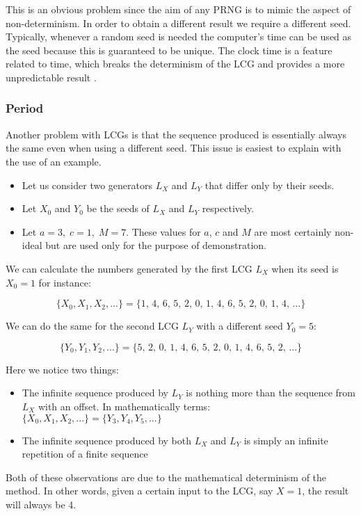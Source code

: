 This is an obvious problem since the aim of any PRNG is to mimic the aspect of non-determinism. In order to obtain a different result we require a different seed. Typically, whenever a random seed is needed the computer's time can be used as the seed because this is guaranteed to be unique. The clock time is a feature related to time, which breaks the determinism of the LCG and provides a more unpredictable result \citep{Knuth_art2}.

\subsubsection{Period}
Another problem with LCGs is that the sequence produced is essentially always the same even when using a different seed. This issue is easiest to explain with the use of an example. 

\begin{itemize}
\item Let us consider two generators $L_X$ and $L_Y$ that differ only by their seeds.
\item Let $X_0$ and $Y_0$ be the seeds of $L_X$ and $L_Y$ respectively.
\item Let $a = 3,\;c = 1,\;M = 7$. These values for $a$, $c$ and $M$ are most certainly non-ideal but are used only for the purpose of demonstration.
\end{itemize}

We can calculate the numbers generated by the first LCG $L_X$ when its seed is $X_0 = 1$ for instance:

$$ \{X_0, X_1, X_2, ...\} = \{1,\,4,\,6,\,5,\,2,\,0,\,1,\,4,\,6,\,5,\,2,\,0,\,1,\,4,\,...\} $$ 

We can do the same for the second LCG $L_Y$ with a different seed $Y_0 = 5$:

$$ \{Y_0, Y_1, Y_2, ...\} = \{5,\,2,\,0,\,1,\,4,\,6,\,5,\,2,\,0,\,1,\,4,\,6,\,5,\,2,\,...\} $$ 

Here we notice two things:
\begin{itemize}
\item The infinite sequence produced by $L_Y$ is nothing more than the sequence from $L_X$ with an offset. In mathematically terms: 
\\ $ \{X_0, X_1, X_2, ...\} = \{Y_3, Y_4, Y_5, ...\} $
\item The infinite sequence produced by both $L_X$ and $L_Y$ is simply an infinite repetition of a finite sequence
\end{itemize}
Both of these observations are due to the mathematical determinism of the method. In other words, given a certain input to the LCG, say $X=1$, the result will always be 4.

